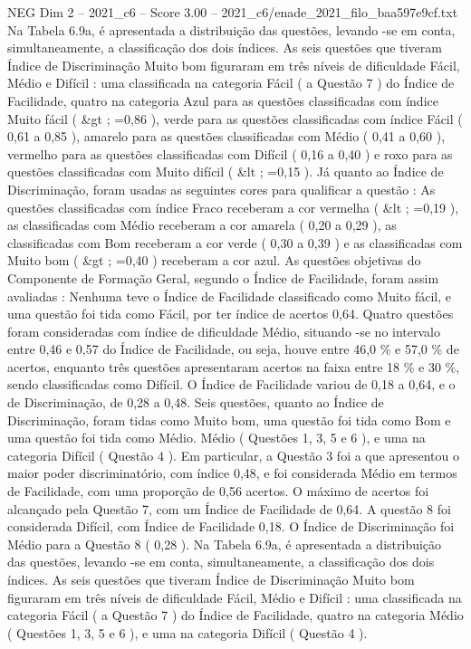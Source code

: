 \begin{textsample}{NEG Dim 2 – 2021\_c6 – Score 3.00 – 2021\_c6/enade\_2021\_filo\_baa597e9cf.txt}
Na Tabela 6.9a, é apresentada a distribuição das questões, levando -se em conta, simultaneamente, a classificação dos dois índices.
As seis questões que tiveram Índice de Discriminação Muito bom figuraram em três níveis de dificuldade Fácil, Médio e Difícil : uma classificada na categoria Fácil ( a Questão 7 ) do Índice de Facilidade, quatro na categoria Azul para as questões classificadas com índice Muito fácil ( \&gt ; =0,86 ), verde para as questões classificadas com índice Fácil ( 0,61 a 0,85 ), amarelo para as questões classificadas com Médio ( 0,41 a 0,60 ), vermelho para as questões classificadas com Difícil ( 0,16 a 0,40 ) e roxo para as questões classificadas com Muito difícil ( \&lt ; =0,15 ).
Já quanto ao Índice de Discriminação, foram usadas as seguintes cores para qualificar a questão : As questões classificadas com índice Fraco receberam a cor vermelha ( \&lt ; =0,19 ), as classificadas com Médio receberam a cor amarela ( 0,20 a 0,29 ), as classificadas com Bom receberam a cor verde ( 0,30 a 0,39 ) e as classificadas com Muito bom ( \&gt ; =0,40 ) receberam a cor azul.
As questões objetivas do Componente de Formação Geral, segundo o Índice de Facilidade, foram assim avaliadas : Nenhuma teve o Índice de Facilidade classificado como Muito fácil, e uma questão foi tida como Fácil, por ter índice de acertos 0,64.
Quatro questões foram consideradas com índice de dificuldade Médio, situando -se no intervalo entre 0,46 e 0,57 do Índice de Facilidade, ou seja, houve entre 46,0 \% e 57,0 \% de acertos, enquanto três questões apresentaram acertos na faixa entre 18 \% e 30 \%, sendo classificadas como Difícil.
O Índice de Facilidade variou de 0,18 a 0,64, e o de Discriminação, de 0,28 a 0,48.
Seis questões, quanto ao Índice de Discriminação, foram tidas como Muito bom, uma questão foi tida como Bom e uma questão foi tida como Médio.
Médio ( Questões 1, 3, 5 e 6 ), e uma na categoria Difícil ( Questão 4 ).
Em particular, a Questão 3 foi a que apresentou o maior poder discriminatório, com índice 0,48, e foi considerada Médio em termos de Facilidade, com uma proporção de 0,56 acertos.
O máximo de acertos foi alcançado pela Questão 7, com um Índice de Facilidade de 0,64.
A questão 8 foi considerada Difícil, com Índice de Facilidade 0,18.
O Índice de Discriminação foi Médio para a Questão 8 ( 0,28 ).
Na Tabela 6.9a, é apresentada a distribuição das questões, levando -se em conta, simultaneamente, a classificação dos dois índices.
As seis questões que tiveram Índice de Discriminação Muito bom figuraram em três níveis de dificuldade Fácil, Médio e Difícil : uma classificada na categoria Fácil ( a Questão 7 ) do Índice de Facilidade, quatro na categoria Médio ( Questões 1, 3, 5 e 6 ), e uma na categoria Difícil ( Questão 4 ).

\end{textsample}

